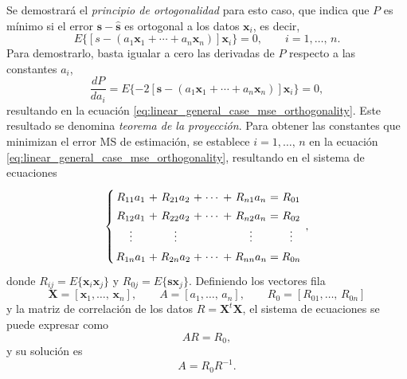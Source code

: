 \documentclass[a4paper]{report}
\newcommand{\X}{\mathbf{X}}
\newcommand{\x}{\mathbf{x}}
\newcommand{\s}{\mathbf{s}}
\begin{document}
Se demostrará el \emph{principio de ortogonalidad} para esto caso, que indica que \(P\) es mínimo si el error \(\s-\hat{\s}\) es ortogonal a los datos \(\x_i\), es decir,
\begin{equation}\label{eq:linear_general_case_mse_orthogonality}
  E\{[s-(a_1\x_1+\cdots+a_n\x_n)]\x_i\}=0,\qquad i=1,\dots,\,n.
\end{equation}
Para demostrarlo, basta igualar a cero las derivadas de \(P\) respecto a las constantes \(a_i\),
\[
 \frac{dP}{da_i}=E\{-2[\s-(a_1\x_1+\cdots+a_n\x_n)]\x_i\}=0,
\]
resultando en la ecuación \ref{eq:linear_general_case_mse_orthogonality}. Este resultado se denomina \emph{teorema de la proyección}. Para obtener las constantes que minimizan el error MS de estimación, se establece \(i=1,\dots,\,n\) en la ecuación \ref{eq:linear_general_case_mse_orthogonality}, resultando en el sistema de ecuaciones
\begin{equation}\label{eq:linear_general_case_mse_coeficients_system}
 \arraycolsep=1.4pt\def\arraystretch{1.4}
 \left\{\begin{array}{ccccccccc}
   R_{11}a_1&+&R_{21}a_2&+&\cdots&+&R_{n1}a_n&=&R_{01}\\
   R_{12}a_1&+&R_{22}a_2&+&\cdots&+&R_{n2}a_n&=&R_{02}\\
   \vdots   & &\vdots   & &      & &\vdots   & &\vdots\\
   R_{1n}a_1&+&R_{2n}a_2&+&\cdots&+&R_{nn}a_n&=&R_{0n}\\
 \end{array}\right.,
\end{equation}
donde \(R_{ij}=E\{\x_i\x_j\}\) y \(R_{0j}=E\{\s\x_j\}\). Definiendo los vectores fila
\[
 \X=[\x_1,\dots,\,\x_n],\qquad A=[a_1,\dots,\,a_n],\qquad R_0=[R_{01},\dots,\,R_{0n}]
\]
y la matriz de correlación de los datos \(R=\X^t\X\), el sistema de ecuaciones se puede expresar como
\[
 AR=R_0,
\]
y su solución es
\begin{equation}\label{eq:linear_general_case_mse_coeficients}
 A=R_0R^{-1}.
\end{equation}
\end{document}
